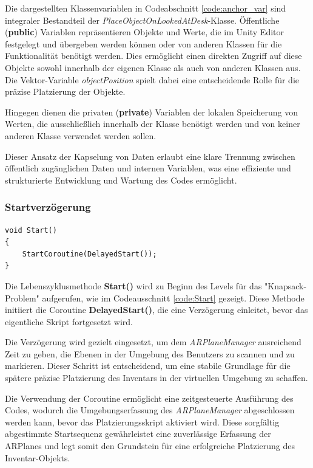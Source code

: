 Die dargestellten Klassenvariablen in Codeabschnitt \ref{code:anchor_var} sind integraler Bestandteil der
\textit{PlaceObjectOnLookedAtDesk}-Klasse. Öffentliche (\textbf{public}) Variablen repräsentieren Objekte und Werte, die
im Unity Editor festgelegt und übergeben werden können oder von anderen Klassen für die Funktionalität benötigt werden.
Dies ermöglicht einen direkten Zugriff auf diese Objekte sowohl innerhalb der eigenen Klasse als auch von anderen Klassen
aus. Die Vektor-Variable \textit{objectPosition} spielt dabei eine entscheidende Rolle für die präzise Platzierung der
Objekte.

Hingegen dienen die privaten (\textbf{private}) Variablen der lokalen Speicherung von Werten, die ausschließlich innerhalb
der Klasse benötigt werden und von keiner anderen Klasse verwendet werden sollen.

Dieser Ansatz der Kapselung von Daten erlaubt eine klare Trennung zwischen öffentlich zugänglichen Daten und internen
Variablen, was eine effiziente und strukturierte Entwicklung und Wartung des Codes ermöglicht.

\subsubsection{Startverzögerung}
\begin{lstlisting}[style=csharp, caption={Beginn des Inventory Placement Controllers}, label=code:Start]
void Start()
{
    StartCoroutine(DelayedStart());
}
\end{lstlisting}
Die Lebenszyklusmethode \textbf{Start()} wird zu Beginn des Levels für das "Knapsack-Problem" aufgerufen, wie im
Codeausschnitt \ref{code:Start} gezeigt. Diese Methode initiiert die Coroutine \textbf{DelayedStart()}, die eine Verzögerung
einleitet, bevor das eigentliche Skript fortgesetzt wird.

Die Verzögerung wird gezielt eingesetzt, um dem \textit{ARPlaneManager} ausreichend Zeit zu geben, die Ebenen in der
Umgebung des Benutzers zu scannen und zu markieren. Dieser Schritt ist entscheidend, um eine stabile Grundlage für die
spätere präzise Platzierung des Inventars in der virtuellen Umgebung zu schaffen.

Die Verwendung der Coroutine ermöglicht eine zeitgesteuerte Ausführung des Codes, wodurch die Umgebungserfassung des
\textit{ARPlaneManager} abgeschlossen werden kann, bevor das Platzierungsskript aktiviert wird. Diese sorgfältig abgestimmte
Startsequenz gewährleistet eine zuverlässige Erfassung der ARPlanes und legt somit den Grundstein für eine erfolgreiche
Platzierung des Inventar-Objekts.

